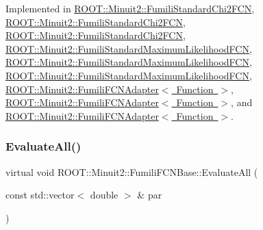 Implemented in \mbox{\hyperlink{classROOT_1_1Minuit2_1_1FumiliStandardChi2FCN_a76f42b6e5d2a92961a9fd8feca38b582}{R\+O\+O\+T\+::\+Minuit2\+::\+Fumili\+Standard\+Chi2\+F\+CN}}, \mbox{\hyperlink{classROOT_1_1Minuit2_1_1FumiliStandardChi2FCN_ace15dd1aad435e460c523bc37bff12a8}{R\+O\+O\+T\+::\+Minuit2\+::\+Fumili\+Standard\+Chi2\+F\+CN}}, \mbox{\hyperlink{classROOT_1_1Minuit2_1_1FumiliStandardChi2FCN_ace15dd1aad435e460c523bc37bff12a8}{R\+O\+O\+T\+::\+Minuit2\+::\+Fumili\+Standard\+Chi2\+F\+CN}}, \mbox{\hyperlink{classROOT_1_1Minuit2_1_1FumiliStandardMaximumLikelihoodFCN_a1faea776f7da3c238e522748b573caab}{R\+O\+O\+T\+::\+Minuit2\+::\+Fumili\+Standard\+Maximum\+Likelihood\+F\+CN}}, \mbox{\hyperlink{classROOT_1_1Minuit2_1_1FumiliStandardMaximumLikelihoodFCN_a37e72fc87092e5699066098fa5a31235}{R\+O\+O\+T\+::\+Minuit2\+::\+Fumili\+Standard\+Maximum\+Likelihood\+F\+CN}}, \mbox{\hyperlink{classROOT_1_1Minuit2_1_1FumiliStandardMaximumLikelihoodFCN_a37e72fc87092e5699066098fa5a31235}{R\+O\+O\+T\+::\+Minuit2\+::\+Fumili\+Standard\+Maximum\+Likelihood\+F\+CN}}, \mbox{\hyperlink{classROOT_1_1Minuit2_1_1FumiliFCNAdapter_a75bacae09c510900a45ea753afae971a}{R\+O\+O\+T\+::\+Minuit2\+::\+Fumili\+F\+C\+N\+Adapter$<$ Function $>$}}, \mbox{\hyperlink{classROOT_1_1Minuit2_1_1FumiliFCNAdapter_a75bacae09c510900a45ea753afae971a}{R\+O\+O\+T\+::\+Minuit2\+::\+Fumili\+F\+C\+N\+Adapter$<$ Function $>$}}, and \mbox{\hyperlink{classROOT_1_1Minuit2_1_1FumiliFCNAdapter_a75bacae09c510900a45ea753afae971a}{R\+O\+O\+T\+::\+Minuit2\+::\+Fumili\+F\+C\+N\+Adapter$<$ Function $>$}}.

\mbox{\label{classROOT_1_1Minuit2_1_1FumiliFCNBase_a0741bb4a7405cc33ab60583472a189cb}} 
\subsubsection{\texorpdfstring{EvaluateAll()}{EvaluateAll()}\hspace{0.1cm}{\footnotesize\ttfamily [3/3]}}
{\footnotesize\ttfamily virtual void R\+O\+O\+T\+::\+Minuit2\+::\+Fumili\+F\+C\+N\+Base\+::\+Evaluate\+All (\begin{DoxyParamCaption}\item[{const std\+::vector$<$ double $>$ \&}]{par }\end{DoxyParamCaption})\hspace{0.3cm}{\ttfamily [pure virtual]}}

